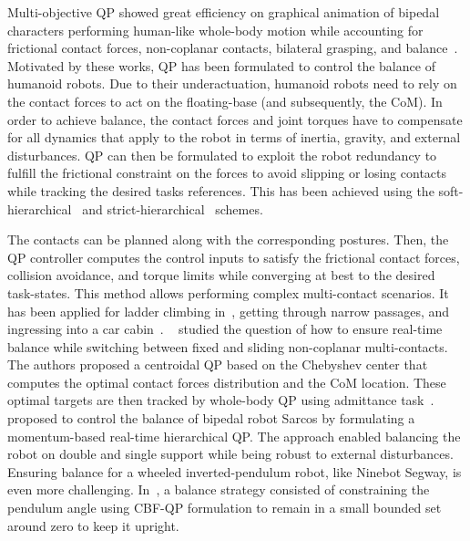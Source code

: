 Multi-objective QP  showed great efficiency on graphical animation of bipedal characters performing human-like whole-body motion while accounting for frictional contact forces, non-coplanar contacts, bilateral grasping, and balance~\cite{abe2007siggraph,delasa2010trGraph,collette2007humanoids}. 
Motivated by these works, QP has been formulated to control the balance of humanoid robots. Due to their underactuation,  humanoid robots need to rely on the contact forces to act on the floating-base (and subsequently, the CoM). In order to achieve balance, the contact forces and joint torques have to compensate for all dynamics that apply to the robot in terms of inertia, gravity, and external disturbances. QP can then be formulated to exploit the robot redundancy to fulfill the frictional constraint on the forces to avoid slipping or losing contacts while tracking the desired tasks references. This has been achieved using the soft-hierarchical~\cite{righetti2012humanoids,righetti2013ijrr} and strict-hierarchical~\cite{sherikov2015humanoids} schemes. 

The contacts can be planned along with the corresponding postures. Then, the QP controller computes the control inputs to satisfy the frictional contact forces, collision avoidance, and torque limits while converging at best to the desired task-states. This method allows performing complex multi-contact scenarios. It has been applied for ladder climbing in~\cite{vaillant2016springer}, getting through narrow passages, and ingressing into a car cabin~\cite{bouyarmane2012humanoids_b}.%
~\cite{samadi2021ral} studied the question of how to ensure real-time balance while switching between fixed and sliding non-coplanar multi-contacts. The authors proposed a centroidal QP based on the Chebyshev center that computes the optimal contact forces distribution and the CoM location. These optimal targets are then tracked by whole-body QP using admittance task~\cite{bouyarmane2019tro}.~\cite{herzog2016autonomousRobot} proposed to control the balance of bipedal robot Sarcos by formulating a momentum-based real-time hierarchical QP. The approach enabled balancing the robot on double and single support while being robust to external disturbances. Ensuring balance for a wheeled inverted-pendulum robot, like Ninebot Segway, is even more challenging. In~\cite{gurriet2018iccps}, a balance strategy consisted of constraining the pendulum angle using CBF-QP formulation to remain in a small bounded set around zero to keep it upright.


